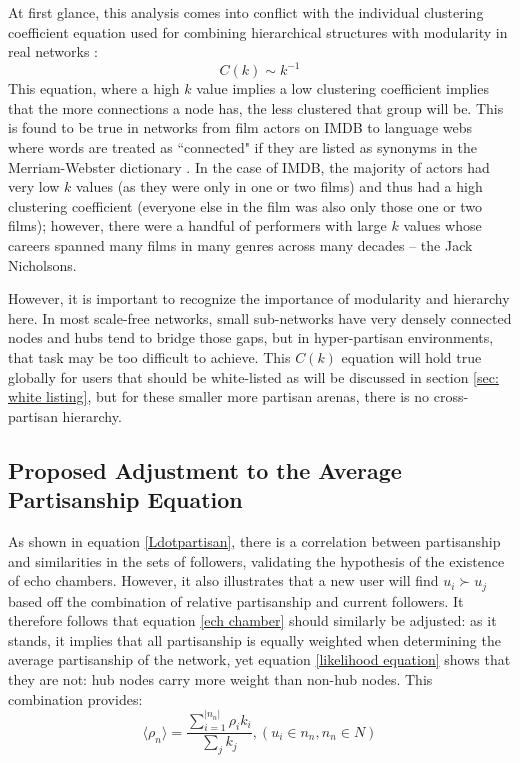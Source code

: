 \documentclass[preprint,review,12pt]{elsarticle}
\begin{document}
At first glance, this analysis comes into conflict with the individual clustering coefficient equation used for combining hierarchical structures with modularity in real networks \cite{ravasz2003hierarchical,dorogovtsev2008critical,dorogovtsev2002pseudofractal}:
\begin{equation}
\label{hierarchy equation}
    C(k) \sim k^{-1}
\end{equation}
This equation, where a high $k$ value implies a low clustering coefficient implies that the more connections a node has, the less clustered that group will be. This is found to be true in networks from film actors on IMDB \cite{amaral2000classes,albert2000topology,barabasi1999emergence} to language webs where words are treated as ``connected" if they are listed as synonyms in the Merriam-Webster dictionary \cite{sole2001small,yook2002modeling,sigman2002global,dorogovtsev2001language}. In the case of IMDB, the majority of actors had very low $k$ values (as they were only in one or two films) and thus had a high clustering coefficient (everyone else in the film was also only those one or two films); however, there were a handful of performers with large $k$ values whose careers spanned many films in many genres across many decades -- the Jack Nicholsons. 

However, it is important to recognize the importance of modularity and hierarchy here. In most scale-free networks, small sub-networks have very densely connected nodes and hubs tend to bridge those gaps, but in hyper-partisan environments, that task may be too difficult to achieve. This $C(k)$ equation will hold true globally for users that should be white-listed as will be discussed in section \ref{sec: white listing}, but for these smaller more partisan arenas, there is no cross-partisan hierarchy. 

\subsection{Proposed Adjustment to the Average Partisanship Equation}
As shown in equation \ref{Ldotpartisan}, there is a correlation between partisanship and similarities in the sets of followers, validating the hypothesis of the existence of echo chambers. However, it also illustrates that a new user will find $u_i \succ u_j$ based off the combination of relative partisanship and current followers. It therefore follows that equation \ref{ech chamber} should similarly be adjusted: as it stands, it implies that all partisanship is equally weighted when determining the average partisanship of the network, yet equation \ref{likelihood equation} shows that they are not: hub nodes carry more weight than non-hub nodes. This combination provides:
\begin{equation}
    \label{echo chamber by followers}
        \langle \rho_n \rangle = \frac{\sum_{i=1}^{|n_n|}\rho_ik_i}{\sum_{j}k_j}, (u_i \in n_n, n_n \in N)
 \end{equation}
 
\end{document}
